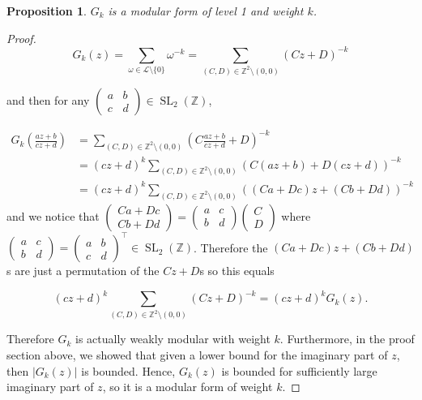 \documentclass{article}
\newtheorem{prop}{Proposition}[section]
\theoremstyle{definition}
\theoremstyle{definition}
\theoremstyle{definition}
\newcommand{\SLZ}{\operatorname{SL}_2(\mathbb{Z})}
\begin{document}
\begin{prop}
    $G_k$ is a modular form of level 1 and weight $k$.
\end{prop}
\begin{proof}
    $$G_k(z)=\sum_{\omega\in\mathcal L\setminus\{0\}}\omega^{-k}=\sum_{(C,D)\in\mathbb Z^2\setminus(0,0)}(Cz+D)^{-k}$$

and then for any $\begin{pmatrix} a&b\\c&d \end{pmatrix}\in\SLZ$,

\begin{align*}
G_k\left(\frac{az+b}{cz+d}\right)&=\sum_{(C,D)\in\mathbb Z^2\setminus(0,0)}\left(C\frac{az+b}{cz+d}+D\right)^{-k}\\
&=(cz+d)^k\sum_{(C,D)\in\mathbb Z^2\setminus(0,0)}\left(C(az+b)+D(cz+d)\right)^{-k}\\
&=(cz+d)^k\sum_{(C,D)\in\mathbb Z^2\setminus(0,0)}\left((Ca + Dc)z+(Cb+Dd)\right)^{-k}
\end{align*}
and we notice that $\begin{pmatrix}Ca+Dc\\Cb+Dd\end{pmatrix}=\begin{pmatrix}a&c\\b&d\end{pmatrix}\begin{pmatrix}C\\D\end{pmatrix}$ where $\begin{pmatrix}a&c\\b&d \end{pmatrix}=\begin{pmatrix} a&b\\c&d \end{pmatrix}^\intercal\in\SLZ$. Therefore the $(Ca + Dc)z+(Cb+Dd)$s are just a permutation of the $Cz+D$s so this equals

$$(cz+d)^k\sum_{(C,D)\in\mathbb Z^2\setminus(0,0)}\left(Cz+D\right)^{-k}=(cz+d)^kG_k(z).$$

Therefore $G_k$ is actually weakly modular with weight $k$. Furthermore, in the proof section above, we showed that given a lower bound for the imaginary part of $z$, then $|G_k(z)|$ is bounded. Hence, $G_k(z)$ is bounded for sufficiently large imaginary part of $z$, so it is a modular form of weight $k$.


\end{proof}
\end{document}
